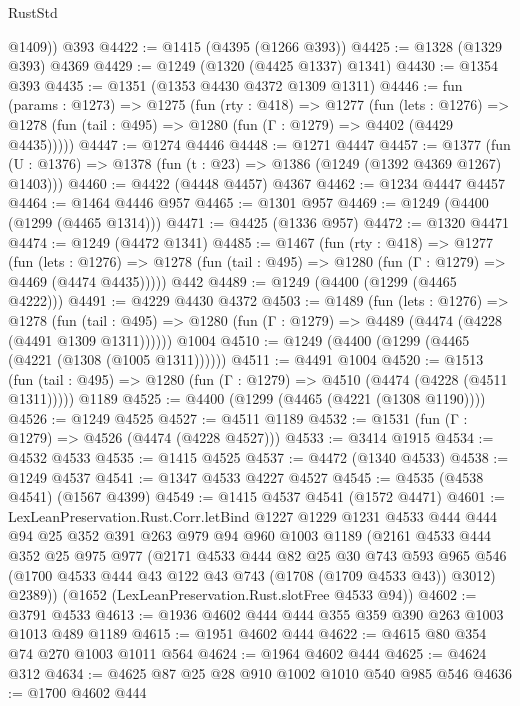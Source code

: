 \begin{lexlean}{RustStd}
\begin{coremodule}
        @1409))
    @393
@4422 := @1415 (@4395 (@1266 @393))
@4425 := @1328 (@1329 @393) @4369
@4429 := @1249 (@1320 (@4425 @1337) @1341)
@4430 := @1354 @393
@4435 := @1351 (@1353 @4430 @4372 @1309 @1311)
@4446 := fun (params : @1273) =>
  @1275
    (fun (rty : @418) =>
    @1277
      (fun (lets : @1276) =>
      @1278 (fun (tail : @495) => @1280 (fun (Γ : @1279) => @4402 (@4429 @4435)))))
@4447 := @1274 @4446
@4448 := @1271 @4447
@4457 := @1377 (fun (U : @1376) => @1378 (fun (t : @23) => @1386 (@1249 (@1392 @4369 @1267) @1403)))
@4460 := @4422 (@4448 @4457) @4367
@4462 := @1234 @4447 @4457
@4464 := @1464 @4446 @957
@4465 := @1301 @957
@4469 := @1249 (@4400 (@1299 (@4465 @1314)))
@4471 := @4425 (@1336 @957)
@4472 := @1320 @4471
@4474 := @1249 (@4472 @1341)
@4485 := @1467
    (fun (rty : @418) =>
    @1277
      (fun (lets : @1276) =>
      @1278 (fun (tail : @495) => @1280 (fun (Γ : @1279) => @4469 (@4474 @4435)))))
    @442
@4489 := @1249 (@4400 (@1299 (@4465 @4222)))
@4491 := @4229 @4430 @4372
@4503 := @1489
    (fun (lets : @1276) =>
    @1278
      (fun (tail : @495) => @1280 (fun (Γ : @1279) => @4489 (@4474 (@4228 (@4491 @1309 @1311))))))
    @1004
@4510 := @1249 (@4400 (@1299 (@4465 (@4221 (@1308 (@1005 @1311))))))
@4511 := @4491 @1004
@4520 := @1513
    (fun (tail : @495) => @1280 (fun (Γ : @1279) => @4510 (@4474 (@4228 (@4511 @1311)))))
    @1189
@4525 := @4400 (@1299 (@4465 (@4221 (@1308 @1190))))
@4526 := @1249 @4525
@4527 := @4511 @1189
@4532 := @1531 (fun (Γ : @1279) => @4526 (@4474 (@4228 @4527)))
@4533 := @3414 @1915
@4534 := @4532 @4533
@4535 := @1415 @4525
@4537 := @4472 (@1340 @4533)
@4538 := @1249 @4537
@4541 := @1347 @4533 @4227 @4527
@4545 := @4535 (@4538 @4541) (@1567 @4399)
@4549 := @1415 @4537 @4541 (@1572 @4471)
@4601 := LexLeanPreservation.Rust.Corr.letBind
    @1227
    @1229
    @1231
    @4533
    @444
    @444
    @94
    @25
    @352
    @391
    @263
    @979
    @94
    @960
    @1003
    @1189
    (@2161
      @4533
      @444
      @352
      @25
      @975
      @977
      (@2171
        @4533
        @444
        @82
        @25
        @30
        @743
        @593
        @965
        @546
        (@1700 @4533 @444 @43 @122 @43 @743 (@1708 (@1709 @4533 @43)) @3012)
        @2389))
    (@1652 (LexLeanPreservation.Rust.slotFree @4533 @94))
@4602 := @3791 @4533
@4613 := @1936 @4602 @444 @444 @355 @359 @390 @263 @1003 @1013 @489 @1189
@4615 := @1951 @4602 @444
@4622 := @4615 @80 @354 @74 @270 @1003 @1011 @564
@4624 := @1964 @4602 @444
@4625 := @4624 @312
@4634 := @4625 @87 @25 @28 @910 @1002 @1010 @540 @985 @546
@4636 := @1700 @4602 @444

\end{coremodule}
\end{lexlean}

